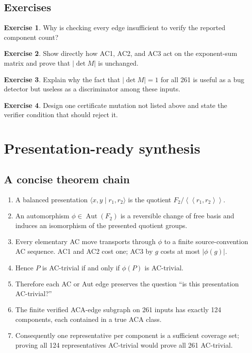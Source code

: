 \documentclass[11pt]{article}
\theoremstyle{definition}
\newtheorem{exercise}{Exercise}[section]
\theoremstyle{remark}
\newcommand{\F}{F_2}
\newcommand{\Aut}{\operatorname{Aut}}
\newcommand{\Ncl}[1]{\left\langle\!\left\langle #1\right\rangle\!\right\rangle}
\newcommand{\len}[1]{\left|#1\right|}
\begin{document}
\subsection*{Exercises}

\begin{exercise}
Why is checking every edge insufficient to verify the reported component
count?
\end{exercise}

\begin{exercise}
Show directly how AC1, AC2, and AC3 act on the exponent-sum matrix and prove
that \(\len{\det M}\) is unchanged.
\end{exercise}

\begin{exercise}
Explain why the fact that \(\len{\det M}=1\) for all 261 is useful as a
bug detector but useless as a discriminator among these inputs.
\end{exercise}

\begin{exercise}
Design one certificate mutation not listed above and state the verifier
condition that should reject it.
\end{exercise}

\section{Presentation-ready synthesis}
\label{sec:presentation}

\subsection{A concise theorem chain}

\begin{enumerate}
  \item A balanced presentation
  \(\langle x,y\mid r_1,r_2\rangle\) is the quotient
  \(\F/\Ncl{r_1,r_2}\).
  \item An automorphism \(\phi\in\Aut(\F)\) is a reversible change of free
  basis and induces an isomorphism of the presented quotient groups.
  \item Every elementary AC move transports through \(\phi\) to a finite
  source-convention AC sequence.  AC1 and AC2 cost one; AC3 by \(g\) costs
  at most \(\len{\phi(g)}\).
  \item Hence \(P\) is AC-trivial if and only if \(\phi(P)\) is
  AC-trivial.
  \item Therefore each AC or Aut edge preserves the question ``is this
  presentation AC-trivial?''
  \item The finite verified ACA-edge subgraph on 261 inputs has exactly
  124 components, each contained in a true ACA class.
  \item Consequently one representative per component is a sufficient
  coverage set; proving all 124 representatives AC-trivial would prove all
  261 AC-trivial.
\end{enumerate}
\end{document}
